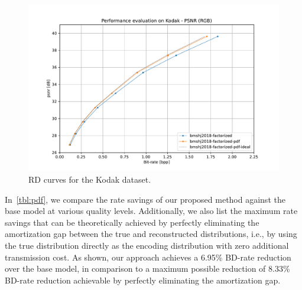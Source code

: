 \begin{figure}[htbp]
  \centering
  \includegraphics[width=\linewidth]{img/pdf_compression/rd-curves-kodak-psnr-bmshj2018-factorized.pdf}
  \caption[RD curves for Kodak dataset]{%
    RD curves for the Kodak dataset.%
  }
  \label{fig:pdf/rd-curves}
\end{figure}



In~\cref{tbl:pdf}, we compare the rate savings of our proposed method against the base model at various quality levels.
Additionally, we also list the maximum rate savings that can be theoretically achieved by perfectly eliminating the amortization gap between the true and reconstructed distributions, i.e., by using the true distribution directly as the encoding distribution with zero additional transmission cost.
As shown, our approach achieves a 6.95\% BD-rate reduction over the base model, in comparison to a maximum possible reduction of 8.33\% BD-rate reduction achievable by perfectly eliminating the amortization gap.


%


